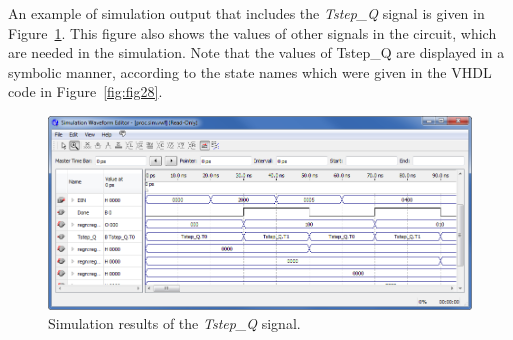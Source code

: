 \documentclass[11pt, twoside, pdftex]{article}
\newcommand{\commonPath}{../../../../Common}
\begin{document}
An example of simulation output that includes the {\it Tstep\_Q} signal is given in Figure~\ref{fig:fig30}.
This figure also shows the values of other signals in the circuit, which are needed in the simulation. 
Note that the values of Tstep\_Q are displayed in a symbolic manner, according to the state names which were 
given in the VHDL code in Figure~\ref{fig:fig28}.
\begin{figure}[H]
   \begin{center}
      \includegraphics[scale=0.65]{figures/appendix/figure30.png}
   \caption{Simulation results of the {\it Tstep\_Q} signal.} 
	 \label{fig:fig30}
	 \end{center}
\end{figure} 	

\fi




\end{document}
